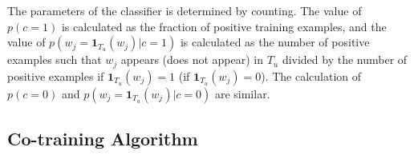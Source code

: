 \documentclass{article}
\begin{document}
The parameters of the classifier is determined by counting. The value of $p(c = 1)$ is calculated as the fraction of positive training examples, and the value of $p(w_j = \mathbf{1}_{T_u}(w_j)|c = 1)$ is calculated as the number of positive examples such that $w_j$ appears (does not appear) in $T_u$ divided by the number of positive examples if $\mathbf{1}_{T_u}(w_j) = 1$ (if $\mathbf{1}_{T_u}(w_j) = 0$). The calculation of $p(c = 0)$ and $p(w_j = \mathbf{1}_{T_u}(w_j)|c = 0)$ are similar.




\subsection{Co-training Algorithm}

\end{document}
